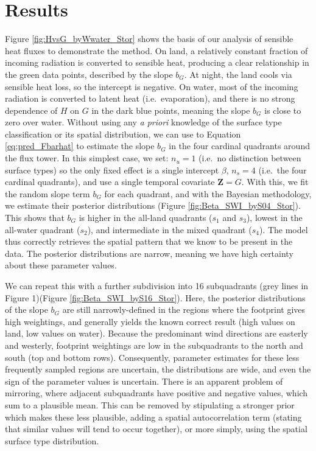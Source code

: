 \section{Results}\label{results}

Figure \ref{fig:HvsG_byWwater_Stor} shows the basis of our analysis of
sensible heat fluxes to demonstrate the method. On land, a relatively
constant fraction of incoming radiation is converted to sensible heat,
producing a clear relationship in the green data points, described by
the slope \(b_G\). At night, the land cools via sensible heat loss, so
the intercept is negative. On water, most of the incoming radiation is
converted to latent heat (i.e.~evaporation), and there is no strong
dependence of \(H\) on \(G\) in the dark blue points, meaning the slope
\(b_G\) is close to zero over water. Without using any \emph{a priori} 
knowledge of the surface type classification or its spatial
distribution, we can use to Equation \ref{eq:pred_Fbarhat} to estimate
the slope \(b_G\) in the four cardinal quadrants around the flux tower.
In this simplest case, we set: \(n_u = 1\) (i.e.~no distinction between
surface types) so the only fixed effect is a single intercept \(\beta\),
\(n_s = 4\) (i.e.~the four cardinal quadrants), and use a single
temporal covariate \(\mathbf{Z} = G\). With this, we fit the random
slope term \(b_G\) for each quadrant, and with the Bayesian methodology,
we estimate their posterior distributions (Figure
\ref{fig:Beta_SWI_byS04_Stor}). This shows that \(b_G\) is higher in the
all-land quadrants (\(s_{1}\) and \(s_{3}\)), lowest in the all-water
quadrant (\(s_{2}\)), and intermediate in the mixed quadrant
(\(s_{4}\)). The model thus correctly retrieves the spatial pattern that
we know to be present in the data. The posterior distributions are
narrow, meaning we have high certainty about these parameter values.

We can repeat this with a further subdivision into 16 subquadrants (grey
lines in Figure 1)(Figure \ref{fig:Beta_SWI_byS16_Stor}). Here, the
posterior distributions of the slope \(b_G\) are still narrowly-defined
in the regions where the footprint gives high weightings, and generally
yields the known correct result (high values on land, low values on
water). Because the predominant wind directions are easterly and
westerly, footprint weightings are low in the subquadrants to the north
and south (top and bottom rows). Consequently, parameter estimates for
these less frequently sampled regions are uncertain, the distributions
are wide, and even the sign of the parameter values is uncertain. There
is an apparent problem of mirroring, where adjacent subquadrants have
positive and negative values, which sum to a plausible mean. This can be
removed by stipulating a stronger prior which makes these less
plausible, adding a spatial autocorrelation term (stating that similar
values will tend to occur together), or more simply, using the spatial
surface type distribution.

